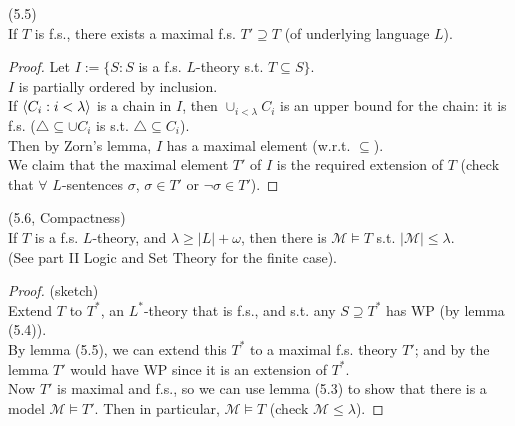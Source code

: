 \documentclass[a4paper]{article}
\begin{document}
\begin{lemma} (5.5)\\
    If $T$ is f.s., there exists a maximal f.s. $T' \supseteq T$ (of underlying language $L$).
    \begin{proof}
        Let $I:= \{ S: S$ is a f.s. $L$-theory s.t. $T \subseteq S\}$.\\
        $I$ is partially ordered by inclusion.\\
        If $\langle C_i: i < \lambda\rangle$ is a chain in $I$, then $\cup_{i < \lambda} C_i$ is an upper bound for the chain: it is f.s. ($\triangle \subseteq \cup C_i$ is s.t. $\triangle \subseteq C_i$).\\
        Then by Zorn's lemma, $I$ has a maximal element (w.r.t. $\subseteq$).\\
        We claim that the maximal element $T'$ of $I$ is the required extension of $T$ (check that $\forall$ $L$-sentences $\sigma$, $\sigma \in T'$ or $\neg \sigma \in T'$).
    \end{proof}
\end{lemma}

\begin{thm} (5.6, Compactness)\\
    If $T$ is a f.s. $L$-theory, and $\lambda \geq |L|+\omega$, then there is $\mathcal{M} \vDash T$ s.t. $|\mathcal{M}| \leq \lambda$.\\
    (See part II Logic and Set Theory for the finite case).\\
    \begin{proof} (sketch)\\
        Extend $T$ to $T^*$, an $L^*$-theory that is f.s., and s.t. any $S \supseteq T^*$ has WP (by lemma (5.4)).\\
        By lemma (5.5), we can extend this $T^*$ to a maximal f.s. theory $T'$; and by the lemma $T'$ would have WP since it is an extension of $T^*$.\\
        Now $T'$ is maximal and f.s., so we can use lemma (5.3) to show that there is a model $\mathcal{M} \vDash T'$. Then in particular, $\mathcal{M} \vDash T$ (check $\mathcal{M} \leq \lambda$).
    \end{proof}
\end{thm}
\end{document}
